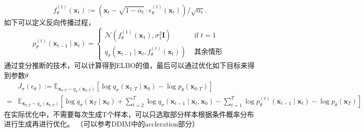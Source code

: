 \begin{equation}
f_\theta^{(t)}\left(\boldsymbol{x}_t\right):=\left(\boldsymbol{x}_t-\sqrt{1-\alpha_t} \cdot \epsilon_\theta^{(t)}\left(\boldsymbol{x}_t\right)\right) / \sqrt{\alpha_t}.
\end{equation}
如下可以定义反向传播过程，
\begin{equation}
 p_\theta^{(t)}\left(\boldsymbol{x}_{t-1} \mid \boldsymbol{x}_t\right)= \begin{cases}\mathcal{N}\left(f_\theta^{(1)}\left(\boldsymbol{x}_1\right), \sigma_1^2 \boldsymbol{I}\right) & \text { if } t=1 \\ q_\sigma\left(\boldsymbol{x}_{t-1} \mid \boldsymbol{x}_t, f_\theta^{(t)}\left(\boldsymbol{x}_t\right)\right) & \text { 其余情形 }\end{cases}   
\end{equation}
通过变分推断的技术，可以计算得到ELBO的值，最后可以通过优化如下目标来得到参数$\theta$
\begin{align} & J_\sigma\left(\epsilon_\theta\right):=\mathbb{E}_{\boldsymbol{x}_{0: T} \sim q_\sigma\left(\boldsymbol{x}_{0: T}\right)}\left[\log q_\sigma\left(\boldsymbol{x}_{1: T} \mid \boldsymbol{x}_0\right)-\log p_\theta\left(\boldsymbol{x}_{0: T}\right)\right] \\ = & \mathbb{E}_{\boldsymbol{x}_{0: T} \sim q_\sigma\left(\boldsymbol{x}_{0: T}\right)}\left[\log q_\sigma\left(\boldsymbol{x}_T \mid \boldsymbol{x}_0\right)+\sum_{t=2}^T \log q_\sigma\left(\boldsymbol{x}_{t-1} \mid \boldsymbol{x}_t, \boldsymbol{x}_0\right)-\sum_{t=1}^T \log p_\theta^{(t)}\left(\boldsymbol{x}_{t-1} \mid \boldsymbol{x}_t\right)-\log p_\theta\left(\boldsymbol{x}_T\right)\right]\end{align}
在实际优化中，不需要每次生成T个样本，可以只选取部分样本根据条件概率分布进行生成再进行优化。
（可以参考DDIM中的accleration部分）
